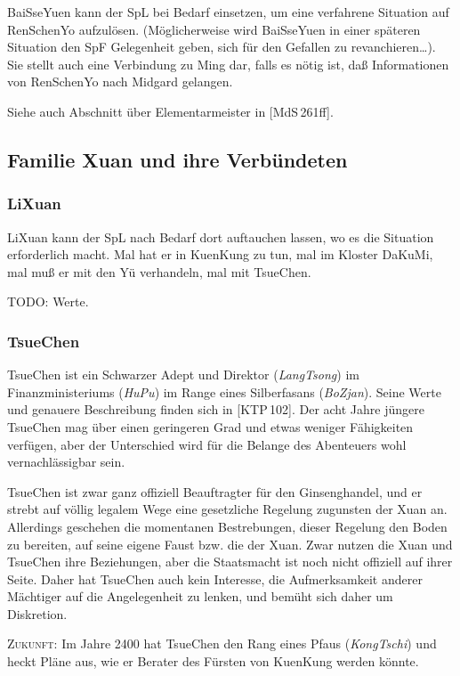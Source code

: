 \documentclass[
a4paper,
twoside,
DIV=calc,
BCOR=4mm,
fontsize=9pt,
twocolumn=on,
titlepage=on,
parskip=half
]{scrartcl}
\begin{document}
BaiSseYuen kann der SpL bei Bedarf einsetzen, um eine verfahrene
Situation auf RenSchenYo aufzulösen. (Möglicherweise wird BaiSseYuen
in einer späteren Situation den SpF Gelegenheit geben, sich für den
Gefallen zu revanchieren\dots). Sie stellt auch eine Verbindung zu
Ming dar, falls es nötig ist, daß Informationen von RenSchenYo nach
Midgard gelangen.

Siehe auch Abschnitt über Elementarmeister in [MdS\,261ff].

\subsection{Familie Xuan und ihre Verbündeten}

\subsubsection{LiXuan}

LiXuan kann der SpL nach Bedarf dort auftauchen lassen, wo es die
Situation erforderlich macht. Mal hat er in KuenKung zu tun, mal im
Kloster DaKuMi, mal muß er mit den Yü verhandeln, mal mit TsueChen.

TODO: Werte.

\subsubsection{TsueChen}

TsueChen ist ein Schwarzer Adept und Direktor (\emph{LangTsong}) im
Finanzministeriums (\emph{HuPu}) im Range eines Silberfasans
(\emph{BoZjan}). Seine Werte und genauere Beschreibung finden sich in
[KTP\,102]. Der acht Jahre jüngere TsueChen mag über einen geringeren
Grad und etwas weniger Fähigkeiten verfügen, aber der Unterschied wird
für die Belange des Abenteuers wohl vernachlässigbar sein.

TsueChen ist zwar ganz offiziell Beauftragter für den Ginsenghandel,
und er strebt auf völlig legalem Wege eine gesetzliche Regelung
zugunsten der Xuan an. Allerdings geschehen die momentanen Bestrebungen, dieser
Regelung den Boden zu bereiten, auf seine eigene Faust bzw. die der
Xuan. Zwar nutzen die Xuan und TsueChen ihre Beziehungen, aber die
Staatsmacht ist noch nicht offiziell auf ihrer Seite. Daher hat
TsueChen auch kein Interesse, die Aufmerksamkeit anderer Mächtiger auf die
Angelegenheit zu lenken, und bemüht sich daher um Diskretion.

\textsc{Zukunft:} Im Jahre 2400 hat TsueChen den Rang eines Pfaus
(\emph{KongTschi}) und heckt Pläne aus, wie er Berater des Fürsten von
KuenKung werden könnte.
\end{document}
